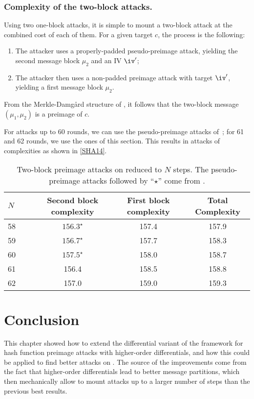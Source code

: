   \subsubsection{Complexity of the two-block attacks.}
  Using two one-block attacks, it is simple to mount a two-block attack at the combined cost of each of them.
  For a given target $c$, the process is the following:
    \begin{enumerate}
      \item The attacker uses a properly-padded pseudo-preimage attack, yielding the second message block $\mu_2$ and an IV $\iv'$;
      \item The attacker then uses a non-padded preimage attack with target $\iv'$, yielding a first message block $\mu_2$.
    \end{enumerate}
From the Merkle-Damg\aa rd structure of \shaone, it follows that the two-block message $(\mu_1, \mu_2)$ 
    is a preimage of $c$.

    For attacks up to 60 rounds, we can use the pseudo-preimage attacks of~\cite{DBLP:conf/crypto/KnellwolfK12}; for 61 and 62 rounds,
    we use the ones of this section. This results in attacks of complexities as shown in \autoref{SHA14}.

  \begin{table}[htb]
    \caption[Two-block preimage.]{Two-block preimage attacks on \shaone reduced to $N$ steps. The pseudo-preimage attacks followed by
    ``$\star$'' come from \cite{DBLP:conf/crypto/KnellwolfK12}.\label{SHA14}}
    \begin{center}
      \begin{tabular}{l c c c } \toprule
        $N\qquad$ & Second block complexity\phantom{bla} & First block complexity\phantom{bla}  & Total Complexity \\\midrule
        58    & $156.3^\star$ & 157.4& 157.9\\ 
        59    & $156.7^\star$ & 157.7& 158.3\\ 
        60    & $157.5^\star$ & 158.0& 158.7\\ 
        61    & 156.4    & 158.5& 158.8\\ 
        62    & 157.0    & 159.0& 159.3\\ 
        \bottomrule
        \hline
      \end{tabular}
    \end{center}
  \end{table}

\section{Conclusion}
This chapter showed how to extend the differential variant of the \mitm framework for hash function preimage attacks with higher-order differentials,
and how this could be applied to find better attacks on \shaone.
The source of the improvements come from the fact that higher-order differentials lead to better message partitions, which
then mechanically allow to mount attacks up to a larger number of steps than the previous best
results.

